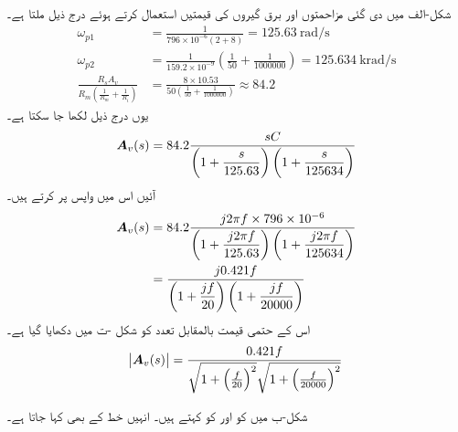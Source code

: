 شکل-الف میں دی گئی مزاحمتوں اور برق گیروں کی قیمتیں استعمال کرتے ہوئے درج ذیل ملتا ہے۔
\begin{align*}
\omega_{p1}&=\frac{1}{796\times 10^{-6}(2+8)}=\SI{125.63}{\radian\per\second}\\
\omega_{p2}&=\frac{1}{159.2\times 10^{-9}}\left(\frac{1}{50}+\frac{1}{1000000}\right)=\SI{125.634}{\kilo\radian\per\second}\\
\frac{R_s A_v}{R_m\left(\frac{1}{R_m}+\frac{1}{R_i}\right)}&=\frac{8 \times 10.53}{50\left(\frac{1}{50}+\frac{1}{1000000}\right)}\approx 84.2
\end{align*}
یوں درج ذیل لکھا جا سکتا ہے۔
\begin{align}\label{مساوت_تعددی_تبادلی_تفاعل_ایمپلیفائر}
{\ensuremath{{\boldsymbol{A}}}}_v(s)= 84.2 \dfrac{sC}{\left(1+\dfrac{s}{125.63}\right)\left(1+\dfrac{s}{125634}\right)}
\end{align}
آئیں اس میں واپس  پر کرتے ہیں۔
\begin{gather}
\begin{aligned}\label{مساوت_تعددی_انقطاعی_تعدد}
{\ensuremath{{\boldsymbol{A}}}}_v(s)&= 84.2 \dfrac{j 2 \pi f \times 796\times 10^{-6}}{\left(1+\dfrac{j 2\pi f}{125.63}\right)\left(1+\dfrac{j 2 \pi f}{125634}\right)}\\
&= \dfrac{j 0.421f}{\left(1+\dfrac{j f}{20}\right)\left(1+\dfrac{j f}{20000}\right)}\\
\end{aligned}
\end{gather}
اس کے حتمی قیمت  بالمقابل تعدد  کو شکل -ت میں دکھایا گیا ہے۔
\begin{align*}
\abs{{{\boldsymbol{A}}}_v(s)}=\frac{0.421 f }{\sqrt{1+\left(\frac{f}{20}\right)^2}\sqrt{1+\left(\frac{f}{20000}\right)^2}}
\end{align*}

شکل-ب میں  کو  اور  کو  کہتے ہیں۔ انہیں خط کے  بھی کہا جاتا ہے۔

